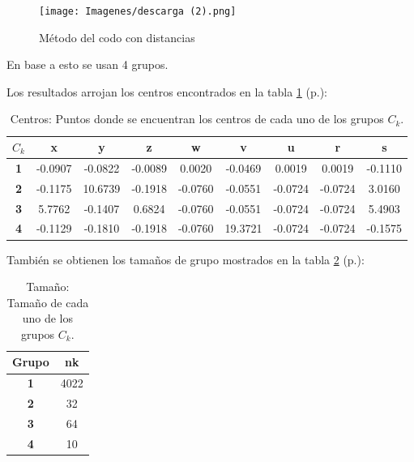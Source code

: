 \documentclass[13.6pt]{article}
\begin{document}
\begin{figure}
\texttt{[image: Imagenes/descarga (2).png]}
\caption{Método del codo con distancias}
\label{fig: cododist}
\end{figure}

En base a esto se usan 4 grupos.


Los resultados arrojan los centros encontrados en la tabla \ref{table:tabkcentros} (p.\pageref{table:tabkcentros}):

\begin{table}[h]\centering
\caption{Centros: Puntos donde se encuentran los centros de cada uno de los grupos $C_k$.}
\label{table:tabkcentros}
\begin{tabular}{ccccccccc}
\hline
\textbf{$C_k$} & \textbf{x} & \textbf{y} & \textbf{z} & \textbf{w} & \textbf{v} & \textbf{u} & \textbf{r} & \textbf{s} \\ \hline
\textbf{1}       & -0.0907  & -0.0822  & -0.0089  & 0.0020   & -0.0469  & 0.0019   & 0.0019   & -0.1110  \\
\textbf{2}       & -0.1175  & 10.6739  & -0.1918  & -0.0760  & -0.0551  & -0.0724  & -0.0724  & 3.0160   \\
\textbf{3}       & 5.7762   & -0.1407  & 0.6824   & -0.0760  & -0.0551  & -0.0724  & -0.0724  & 5.4903   \\
\textbf{4}       & -0.1129  & -0.1810  & -0.1918  & -0.0760  & 19.3721  & -0.0724  & -0.0724  & -0.1575  \\ \hline
\end{tabular}
\end{table}

También se obtienen los tamaños de grupo mostrados en la tabla \ref{table: noelementos} (p.\pageref{table: noelementos}):

\begin{table}[h]\centering
\caption{Tamaño: Tamaño de cada uno de los grupos $C_k$.}

\begin{tabular}{cc}
\hline
\textbf{Grupo} & \textbf{nk} \\ \hline
\textbf{1}       & 4022        \\
\textbf{2}       & 32          \\
\textbf{3}       & 64          \\
\textbf{4}       & 10          \\ \hline
\end{tabular}
\label{table: noelementos}
\end{table}
\end{document}
